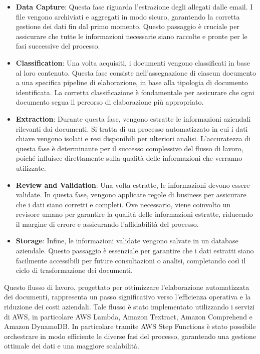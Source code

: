 \begin{itemize}
  \item \textbf{Data Capture}: Questa fase riguarda l'estrazione degli allegati dalle email. I file vengono archiviati e aggregati in modo sicuro, garantendo la corretta gestione dei dati fin dal primo momento. Questo passaggio è cruciale per assicurare che tutte le informazioni necessarie siano raccolte e pronte per le fasi successive del processo.
  
  \item \textbf{Classification}: Una volta acquisiti, i documenti vengono classificati in base al loro contenuto. Questa fase consiste nell'assegnazione di ciascun documento a una specifica pipeline di elaborazione, in base alla tipologia di documento identificata. La corretta classificazione è fondamentale per assicurare che ogni documento segua il percorso di elaborazione più appropriato.

  \item \textbf{Extraction}: Durante questa fase, vengono estratte le informazioni aziendali rilevanti dai documenti. Si tratta di un processo automatizzato in cui i dati chiave vengono isolati e resi disponibili per ulteriori analisi. L'accuratezza di questa fase è determinante per il successo complessivo del flusso di lavoro, poiché influisce direttamente sulla qualità delle informazioni che verranno utilizzate.

  \item \textbf{Review and Validation}: Una volta estratte, le informazioni devono essere validate. In questa fase, vengono applicate regole di business per assicurare che i dati siano corretti e completi. Ove necessario, viene coinvolto un revisore umano per garantire la qualità delle informazioni estratte, riducendo il margine di errore e assicurando l'affidabilità del processo.

  \item \textbf{Storage}: Infine, le informazioni validate vengono salvate in un database aziendale. Questo passaggio è essenziale per garantire che i dati estratti siano facilmente accessibili per future consultazioni o analisi, completando così il ciclo di trasformazione dei documenti.
\end{itemize}

Questo flusso di lavoro, progettato per ottimizzare l'elaborazione automatizzata dei documenti, rappresenta un passo significativo verso l'efficienza operativa e la riduzione dei costi aziendali. Tale flusso è stato implementato utilizzando i servizi di AWS, in particolare AWS Lambda, Amazon Textract, Amazon Comprehend e Amazon DynamoDB. In particolare tramite AWS Step Functions è stato possibile orchestrare in modo efficiente le diverse fasi del processo, garantendo una gestione ottimale dei dati e una maggiore scalabilità.

